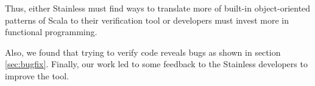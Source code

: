 \documentclass[runningheads]{llncs}
\begin{document}
Thus, either Stainless must find ways to translate more of built-in
object-oriented patterns of Scala to their verification tool or
developers must invest more in functional programming.

Also, we found that trying to verify code reveals bugs as shown in
section \ref{sec:bugfix}.  Finally, our work led to some feedback to
the Stainless developers to improve the tool.









\end{document}
